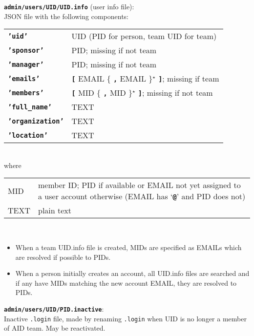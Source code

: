 \documentclass[12pt]{article}
\newenvironment{indpar}[1][0.4in]%
	{\begin{list}{}%
		     {\setlength{\itemsep}{0in}%
		      \setlength{\topsep}{0in}%
		      \setlength{\parsep}{1ex}%
		      \setlength{\labelwidth}{#1}%
		      \setlength{\leftmargin}{#1}%
		      \addtolength{\leftmargin}{\labelsep}}%
	 \item}%
	{\end{list}}
\newenvironment{itemlist}[1][0.2in]%
	{\begin{list}{}{\setlength{\labelwidth}{#1}%
		        \setlength{\leftmargin}{\labelwidth}%
		        \addtolength{\leftmargin}{+0.2in}%
		        \addtolength{\linewidth}{-\labelwidth}%
		        \addtolength{\linewidth}{-0.2in}%
		        \renewcommand{\makelabel}[1]{##1\hfill}}
	 \raggedright}%
	{\end{list}}
\newcommand{\TT}[1]{{\tt \bfseries #1}}
\newcommand{\STAR}{{\Large $^\star$}}
\begin{document}
\begin{indpar}
\begin{itemlist}
\item[\TT{admin/users/UID/UID.info} (user info file):]~
\label{ADMIN/USERS/UID/UID.INFO} \\
JSON file with the following components:
\begin{tabular}[t]{ll}
\TT{'uid'} & UID (PID for person, team UID for team) \\
\TT{'sponsor'} & PID; missing if not team \\
\TT{'manager'} & PID; missing if not team \\
\TT{'emails'} & \TT{[} EMAIL \{ \TT{,} EMAIL \}\STAR{} \TT{]};
                missing if team \\
\TT{'members'} & \TT{[} MID \{ \TT{,} MID \}\STAR{} \TT{]};
                missing if not team \\
\TT{'full\_name'} & TEXT \\
\TT{'organization'} & TEXT \\
\TT{'location'} & TEXT \\
\end{tabular}
\\
where
\\
\begin{tabular}[t]{lp{4.0in}}
MID & member ID; PID if available or EMAIL not yet assigned to a user
      account otherwise (EMAIL has `\TT{@}' and PID does not) \\
TEXT & plain text \\
\end{tabular}
\\
\begin{itemize}
\item When a team UID.info file is created, MIDs are specified
as EMAILs which are resolved if possible to PIDs.
\item When a person initially creates an account, all
UID.info files are searched and if any have MIDs matching
the new account EMAIL, they are resolved to PIDs.
\end{itemize}

\item[\TT{admin/users/UID/PID.inactive}:]~
\label{ADMIN/USERS/UID/PID.INACTIVE} \\
Inactive {\tt .login} file, made by renaming {\tt .login}
when UID is no longer a member
of AID team.  May be reactivated.

\end{itemlist}
\end{indpar}
\end{document}
